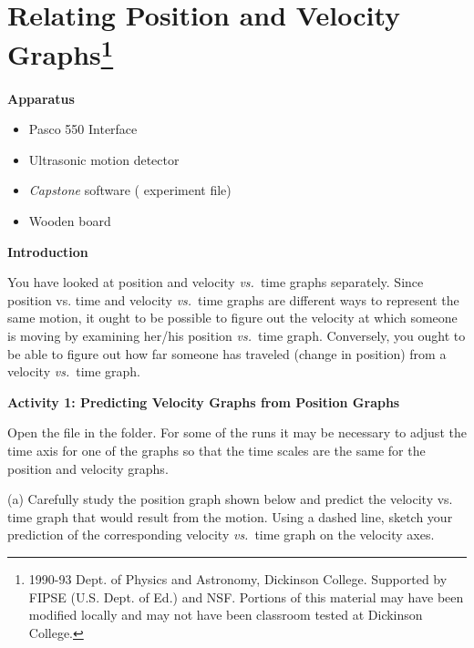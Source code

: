 
\section{Relating Position and Velocity Graphs\footnote{
1990-93 Dept. of Physics and Astronomy, Dickinson College. Supported by FIPSE
(U.S. Dept. of Ed.) and NSF. Portions of this material may have been modified
locally and may not have been classroom tested at Dickinson College.
}}


\makelabheader %

%

\bigskip

\textbf{Apparatus} 

\begin{itemize}[nosep]
\item Pasco 550 Interface
\item Ultrasonic motion detector 
\item \textit{Capstone} software ( experiment file)
\item Wooden board
\end{itemize}

\bigskip
\textbf{Introduction} 

You have looked at position and velocity \textit{vs.}~time graphs separately. Since position
vs. time and velocity \textit{vs.}~time graphs are different ways to represent the same
motion, it ought to be possible to figure out the velocity at which someone
is moving by examining her/his position \textit{vs.}~time graph. Conversely, you ought
to be able to figure out how far someone has traveled (change in position) from
a velocity \textit{vs.}~time graph.


\bigskip

\textbf{Activity 1: Predicting Velocity Graphs from Position Graphs} 

Open the file  in the \filename{\coursefolder} folder.
For some of the runs it may be necessary to adjust the time axis for one of the graphs so that the time scales are the same for the position and velocity graphs.

(a) Carefully study the position graph shown below and predict the velocity
vs. time graph that would result from the motion. Using a dashed line, sketch
your prediction of the corresponding velocity \textit{vs.}~time graph on the velocity
axes.

